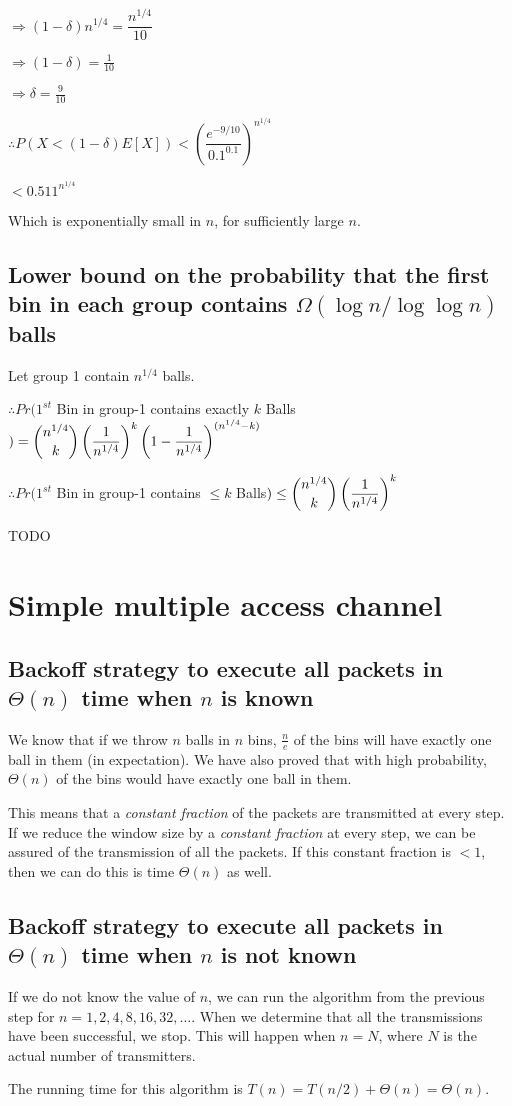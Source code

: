 \documentclass{article}
\begin{document}
$\Rightarrow (1-\delta)n^{1/4} = \dfrac{n^{1/4}}{10}$

$\Rightarrow (1-\delta) = \frac{1}{10}$

$\Rightarrow \delta = \frac{9}{10}$

$\therefore P(X < (1-\delta)E[X]) < \left(\dfrac{e^{-9/10}}{0.1^{0.1}}\right)^{n^{1/4}}$

$< 0.511^{n^{1/4}}$

Which is exponentially small in $n$, for sufficiently large $n$.


\subsection{Lower bound on the probability that the first bin in each group contains $\Omega(\log{n}/\log{\log{n}})$ balls}

Let group 1 contain $n^{1/4}$ balls.

$\therefore Pr(1^{st}$ Bin in group-1 contains exactly $k$ Balls$) = \dbinom{n^{1/4}}{k} \left( \dfrac{1}{n^{1/4}} \right)^{k} \left( 1 - \dfrac{1}{n^{1/4}} \right)^{(n^{1/4} - k)}$

$\therefore Pr(1^{st}$ Bin in group-1 contains $\le k$ Balls$) \le \dbinom{n^{1/4}}{k} \left( \dfrac{1}{n^{1/4}} \right)^{k}$

TODO

\clearpage

\section {Simple multiple access channel}

\subsection{Backoff strategy to execute all packets in $\Theta(n)$ time when $n$ is \textbf{known}}

We know that if we throw $n$ balls in $n$ bins, $\frac{n}{e}$ of the
bins will have exactly one ball in them (in expectation). We have also
proved that with high probability, $\Theta(n)$ of the bins would have
exactly one ball in them.

This means that a \textit{constant fraction} of the packets are
transmitted at every step. If we reduce the window size by a
\textit{constant fraction} at every step, we can be assured of the
transmission of all the packets. If this constant fraction is $< 1$,
then we can do this is time $\Theta(n)$ as well.

\subsection{Backoff strategy to execute all packets in $\Theta(n)$ time when $n$ is \textbf{not known}}

If we do not know the value of $n$, we can run the algorithm from the
previous step for $n = 1, 2, 4, 8, 16, 32, \ldots{}$. When we
determine that all the transmissions have been successful, we
stop. This will happen when $n = N$, where $N$ is the actual number of
transmitters.

The running time for this algorithm is $T(n) = T(n/2) + \Theta(n) =
\Theta(n)$.


\clearpage
\end{document}
